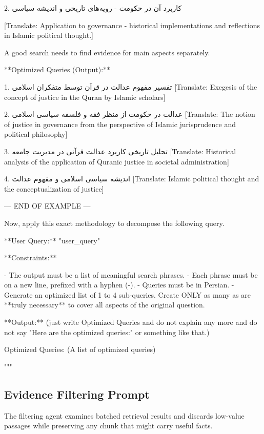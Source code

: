 \documentclass[11pt]{article}
\begin{document}
\begin{PromptBlock}
2. کاربرد آن در حکومت - رویه‌های تاریخی و اندیشه سیاسی

[Translate: Application to governance - historical implementations and reflections in Islamic political thought.]

A good search needs to find evidence for main aspects separately.

**Optimized Queries (Output):**

1. تفسیر مفهوم عدالت در قرآن توسط متفکران اسلامی
[Translate: Exegesis of the concept of justice in the Quran by Islamic scholars]

2. عدالت در حکومت از منظر فقه و فلسفه سیاسی اسلامی
[Translate: The notion of justice in governance from the perspective of Islamic jurisprudence and political philosophy]

3. تحلیل تاریخی کاربرد عدالت قرآنی در مدیریت جامعه
[Translate: Historical analysis of the application of Quranic justice in societal administration]

4. اندیشه سیاسی اسلامی و مفهوم عدالت
[Translate: Islamic political thought and the conceptualization of justice]

--- END OF EXAMPLE ---

Now, apply this exact methodology to decompose the following query.

**User Query:** "{user_query}"

**Constraints:**

- The output must be a list of meaningful search phrases.
- Each phrase must be on a new line, prefixed with a hyphen (-).
- Queries must be in Persian.
- Generate an optimized list of 1 to 4 sub-queries. Create ONLY as many as are **truly necessary** to cover all aspects of the original question.

**Output:** (just write Optimized Queries and do not explain any more and do not say "Here are the optimized queries:" or something like that.)

Optimized Queries: (A list of optimized queries)

"""
\end{PromptBlock}

\subsection{Evidence Filtering Prompt}

The filtering agent examines batched retrieval results and discards low-value passages while preserving any chunk that might carry useful facts.
\end{document}
